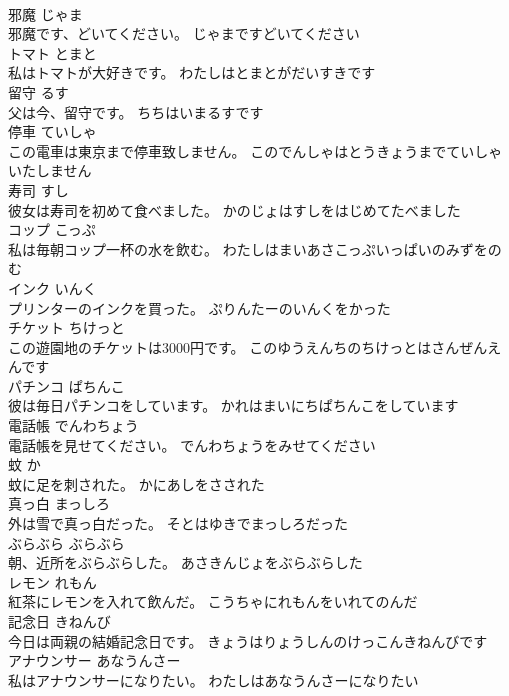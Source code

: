 \documentclass[8pt]{extreport}
\begin{document}
\begin{CJK}{UTF8}{min}
\\	邪魔	じゃま	
\\	邪魔です、どいてください。	じゃまですどいてください	
\\	トマト	とまと	
\\	私はトマトが大好きです。	わたしはとまとがだいすきです	
\\	留守	るす	
\\	父は今、留守です。	ちちはいまるすです	
\\	停車	ていしゃ	
\\	この電車は東京まで停車致しません。	このでんしゃはとうきょうまでていしゃいたしません	
\\	寿司	すし	
\\	彼女は寿司を初めて食べました。	かのじょはすしをはじめてたべました	
\\	コップ	こっぷ	
\\	私は毎朝コップ一杯の水を飲む。	わたしはまいあさこっぷいっぱいのみずをのむ	
\\	インク	いんく	
\\	プリンターのインクを買った。	ぷりんたーのいんくをかった	
\\	チケット	ちけっと	
\\	この遊園地のチケットは3000円です。	このゆうえんちのちけっとはさんぜんえんです	
\\	パチンコ	ぱちんこ	
\\	彼は毎日パチンコをしています。	かれはまいにちぱちんこをしています	
\\	電話帳	でんわちょう	
\\	電話帳を見せてください。	でんわちょうをみせてください	
\\	蚊	か	
\\	蚊に足を刺された。	かにあしをさされた	
\\	真っ白	まっしろ	
\\	外は雪で真っ白だった。	そとはゆきでまっしろだった	
\\	ぶらぶら	ぶらぶら	
\\	朝、近所をぶらぶらした。	あさきんじょをぶらぶらした	
\\	レモン	れもん	
\\	紅茶にレモンを入れて飲んだ。	こうちゃにれもんをいれてのんだ	
\\	記念日	きねんび	
\\	今日は両親の結婚記念日です。	きょうはりょうしんのけっこんきねんびです	
\\	アナウンサー	あなうんさー	
\\	私はアナウンサーになりたい。	わたしはあなうんさーになりたい	

\end{CJK}
\end{document}
